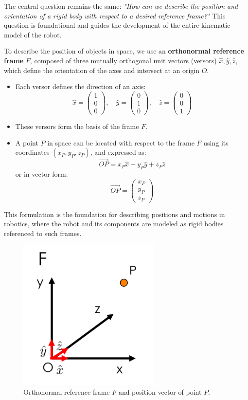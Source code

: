The central question remains the same: \textit{"How can we describe the position and orientation of a rigid body with respect to a desired reference frame?"} This question is foundational and guides the development of the entire kinematic model of the robot.

To describe the position of objects in space, we use an \textbf{orthonormal reference frame} $F$, composed of three mutually orthogonal unit vectors (versors) $\hat{x}, \hat{y}, \hat{z}$, which define the orientation of the axes and intersect at an origin $O$.

\begin{itemize}
  \item Each versor defines the direction of an axis:
    \[
    \hat{x} = \begin{pmatrix}1 \\ 0 \\ 0\end{pmatrix}, \quad
    \hat{y} = \begin{pmatrix}0 \\ 1 \\ 0\end{pmatrix}, \quad
    \hat{z} = \begin{pmatrix}0 \\ 0 \\ 1\end{pmatrix}
    \]
  \item These versors form the basis of the frame $F$.
  \item A point $P$ in space can be located with respect to the frame $F$ using its coordinates $(x_P, y_P, z_P)$, and expressed as:
    \[
    \vec{OP} = x_P \hat{x} + y_P \hat{y} + z_P \hat{z}
    \]
    or in vector form:
    \[
    \vec{OP} = 
    \begin{pmatrix}
    x_P \\
    y_P \\
    z_P
    \end{pmatrix}
    \]
\end{itemize}

This formulation is the foundation for describing positions and motions in robotics, where the robot and its components are modeled as rigid bodies referenced to such frames.

\begin{figure}[H]
  \centering
  \includegraphics[width=0.3\linewidth]{imgs/rigid_body_reference_frame.png}
  \caption{Orthonormal reference frame $F$ and position vector of point $P$.}
\end{figure}

